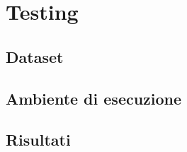 \chapter{Testing} 

\begin{citazione}
\end{citazione}
\newpage

\section{Dataset}
\section{Ambiente di esecuzione}
\section{Risultati}